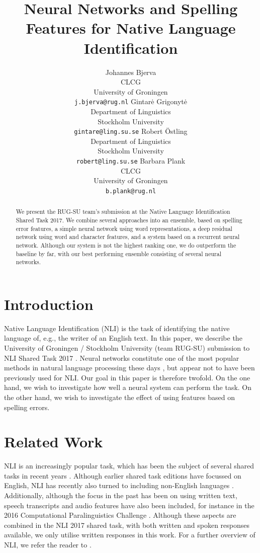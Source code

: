 \documentclass[11pt,letterpaper]{article}
\title{Neural Networks and Spelling Features for Native Language Identification}
\author{Johannes Bjerva \\ CLCG \\ University of Groningen \\ {\tt j.bjerva@rug.nl}
        \And Gintar\.e Grigonyt\.e \\ Department of Linguistics \\ Stockholm University \\ {\tt gintare@ling.su.se}
        \AND Robert {\"O}stling \\ Department of Linguistics \\  Stockholm University \\ {\tt robert@ling.su.se}
        \And Barbara Plank \\ CLCG \\ University of Groningen \\ {\tt b.plank@rug.nl}
}
\date{}
\begin{document}
\maketitle

\begin{abstract}
    We present the RUG-SU team's submission at the Native
    Language Identification Shared Task 2017.
    We combine several approaches into an ensemble, based on spelling error features, a simple neural network using word representations, a deep residual network using word and character features, and a system based on a recurrent neural network.
    Although our system is not the highest ranking one, we do outperform the baseline by far, with our best performing ensemble consisting of several neural networks.
\end{abstract}


\section{Introduction}

Native Language Identification (NLI) is the task of identifying the native language of, e.g., the writer of an English text.
In this paper, we describe the University of Groningen / Stockholm University (team RUG-SU) submission to NLI Shared Task 2017 \citep{nli2017}.
Neural networks constitute one of the most popular methods in natural language processing these days \citep{manning:2016}, but appear not to have been previously used for NLI.
Our goal in this paper is therefore twofold.
On the one hand, we wish to investigate how well a neural system can perform the task.
On the other hand, we wish to investigate the effect of using features based on spelling errors.

\section{Related Work}

NLI is an increasingly popular task, which has been the subject of several shared tasks in recent years \citep{nli2013,compare2016,nli2017}.
Although earlier shared task editions have focussed on English, NLI has recently also turned to including non-English languages \citep{multilingual-nli}.
Additionally, although the focus in the past has been on using written text, speech transcripts and audio features have also been included, for instance in the 2016 Computational Paralinguistics Challenge \citep{compare2016}.
Although these aspects are combined in the NLI 2017 shared task, with both written and spoken responses available, we only utilise written responses in this work.
For a further overview of NLI, we refer the reader to \citet{malmasi2016}.
\end{document}
